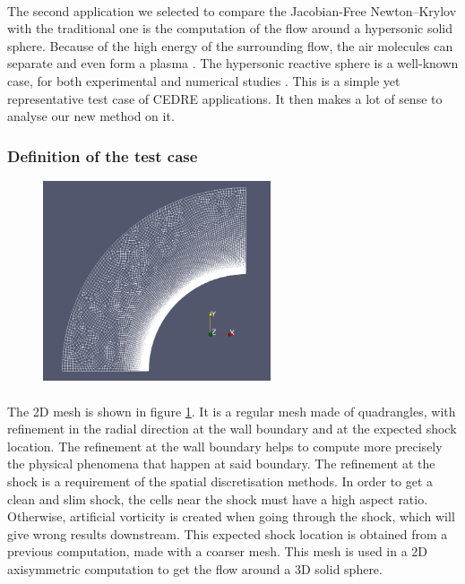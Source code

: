       \paragraph{}
      The second application we selected to compare the Jacobian-Free Newton--Krylov with the traditional one is the computation of the flow around a hypersonic solid sphere.
      Because of the high energy of the surrounding flow, the air molecules can separate and even form a plasma .
      The hypersonic reactive sphere is a well-known case, for both experimental \cite{Lobb1964} and numerical studies \cite{DobrovGimadievKarpenkoEtAl2022}.
      This is a simple yet representative test case of CEDRE applications.
      It then makes a lot of sense to analyse our new method on it.

      \subsubsection{Definition of the test case}


        \begin{figure}
          \centering
          \includegraphics[width=0.6\textwidth]{figures/sphere_mesh.png}
          \caption{}
          \label{fig:sphere_mesh}
        \end{figure}

        \paragraph{}
        The 2D mesh is shown in figure \ref{fig:sphere_mesh}.
        It is a regular mesh made of quadrangles, with refinement in the radial direction at the wall boundary and at the expected shock location.
        The refinement at the wall boundary helps to compute more precisely the physical phenomena that happen at said boundary.
        The refinement at the shock is a requirement of the spatial discretisation methods.
        In order to get a clean and slim shock, the cells near the shock must have a high aspect ratio.
        Otherwise, artificial vorticity is created when going through the shock, which will give wrong results downstream. 
        This expected shock location is obtained from a previous computation, made with a coarser mesh.
        This mesh is used in a 2D axisymmetric computation to get the flow around a 3D solid sphere.

